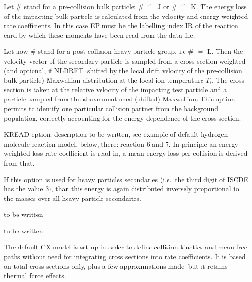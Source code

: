\begin{description}
        Let \# stand for a pre-collision bulk particle: \# $  \hat{=} $ J or \# $
          \hat{=} $ K.
        The energy loss of the impacting bulk particle is calculated from the velocity
        and energy weighted rate coefficients.
        In this case EP must be the labelling index IR	of the reaction card by which
        these moments have been read from the data-file.

        Let now \# stand for a post-collision heavy particle group, i.e \# $ \hat{=} $
        L.
        Then the velocity vector of the secondary particle is sampled from a cross
        section weighted (and optional, if NLDRFT, shifted by the local drift velocity
        of the pre-collision bulk particle) Maxwellian distribution at the local ion
        temperature $T_i$.
        The cross section is taken at the relative velocity of the impacting test
        particle and a particle sampled from the above mentioned (shifted) Maxwellian.
        This option permits to identify one particular collision partner from the
        background population, correctly accounting for the energy dependence of the
        cross section.
  \item[\# = 3] KREAD option: description to be written, see example of default
        hydrogen molecule reaction model, below, there: reaction 6 and 7.
        In principle an energy weighted loss rate coefficient is read in, a mean energy
        loss per collision is derived from that.

        If this option is used for heavy particles secondaries (i.e.\ the third digit
        of ISCDE has the value 3), than this energy is again distributed inversely
        proportional to the masses over all heavy particle secondaries.

  \item[\# = 4] to be written
  \item[\# = 5] to be written
\end{description}


The default CX model is set up in order to define collision kinetics and mean
free paths without need for integrating cross sections into rate coefficients.
It is based on total cross sections only, plus a few approximations made, but
it retains thermal force effects.

